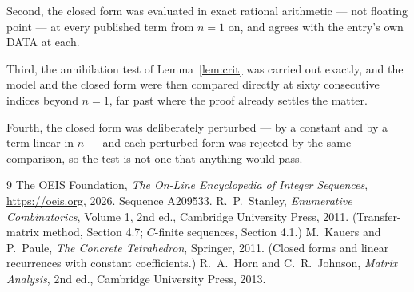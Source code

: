 \documentclass[11pt,a4paper]{article}
\theoremstyle{plain}
\theoremstyle{definition}
\begin{document}
Second, the closed form was evaluated in exact rational arithmetic --- not floating point ---
at every published term from $n=1$ on, and agrees with the entry's own DATA at each.

Third, the annihilation test of Lemma~\ref{lem:crit} was carried out exactly, and the model
and the closed form were then compared directly at sixty consecutive indices beyond
$n=1$, far past where the proof already settles the matter.

Fourth, the closed form was deliberately perturbed --- by a constant and by a term linear in
$n$ --- and each perturbed form was rejected by the same comparison, so the test is not one
that anything would pass.

\begin{thebibliography}{9}
 The OEIS Foundation, \emph{The On-Line Encyclopedia of Integer
Sequences}, \url{https://oeis.org}, 2026. Sequence A209533.
 R.~P.~Stanley, \emph{Enumerative Combinatorics}, Volume 1, 2nd ed.,
Cambridge University Press, 2011. (Transfer-matrix method, Section 4.7; $C$-finite sequences,
Section 4.1.)
 M.~Kauers and P.~Paule, \emph{The Concrete Tetrahedron}, Springer, 2011.
(Closed forms and linear recurrences with constant coefficients.)
 R.~A.~Horn and C.~R.~Johnson, \emph{Matrix Analysis}, 2nd ed., Cambridge
University Press, 2013.
\end{thebibliography}
\end{document}
